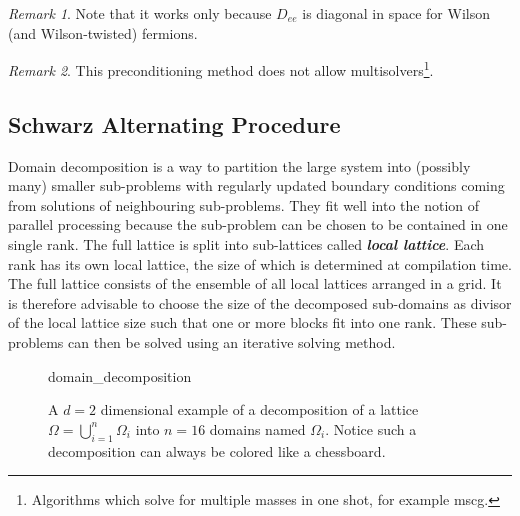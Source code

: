 \documentclass{article}
\theoremstyle{plain} %
\theoremstyle{convention} %
\theoremstyle{remark} %
\newtheorem*{remark}{Remark} %
\def\df#1{\textbf{\textit{#1}}}
\numberwithin{equation}{section}
\begin{document}
\begin{remark}
Note that it works only because $D_{ee}$ is diagonal in space for Wilson (and Wilson-twisted) fermions.
\end{remark}

\begin{remark}
This preconditioning method does not allow multisolvers\footnote{Algorithms which solve for multiple masses in one shot, for example \acrshort{mscg}.}.
\end{remark}

\subsection{Schwarz Alternating Procedure}

\label{sec:ddecomp}

Domain decomposition is a way to partition the large system into (possibly many) smaller sub-problems with regularly updated boundary conditions coming from solutions of neighbouring sub-problems. They fit well into the notion of parallel processing because the sub-problem can be chosen to be contained in one single rank. The full lattice is split into sub-lattices called \df{local lattice}. Each rank has its own local lattice, the size of which is determined at compilation time. The full lattice consists of the ensemble of all local lattices arranged in a grid. It is therefore advisable to choose the size of the decomposed sub-domains as divisor of the local lattice size such that one or more blocks fit into one rank. These sub-problems can then be solved using an iterative solving method.

\begin{figure}[h]
  \centering
  {domain_decomposition}
  \caption{A $d=2$ dimensional example of a decomposition of a lattice $\Omega = \bigcup_{i=1}^{n} \Omega_i$ into $n=16$ domains named $\Omega_i$. Notice such a decomposition can always be colored like a chessboard.}
  \label{fig:ddecomp}
\end{figure}
\end{document}
